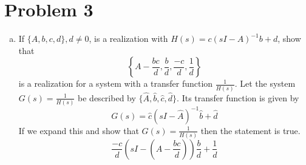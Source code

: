 \documentclass{article}
\begin{document}
\newpage
\section*{Problem 3}
\begin{enumerate}[(a)]
\item If $\{A, b, c, d\}, d \neq 0$, is a realization with $H(s) = c(sI-A)^{-1}b +d$, show that
$$ \left\{ A - \frac{bc}{d}, \frac{b}{d}, \frac{-c}{d}, \frac{1}{d} \right\} $$
is a realization for a system with a transfer function $\frac{1}{H(s)}$.
\newline
\newline
Let the system $G(s) = \frac{1}{H(s)}$ be described by $\{\hat{A}, \hat{b}, \hat{c}, \hat{d}\}$.
Its transfer function is given by
$$
G(s) = \hat{c}(sI-\hat{A})^{-1}\hat{b}+\hat{d}
$$
If we expand this and show that $G(s) = \frac{1}{H(s)}$ then the statement is true.
$$\frac{-c}{d} (sI - (A - \frac{bc}{d}))\frac{b}{d} + \frac{1}{d}$$


\end{enumerate}
\end{document}

